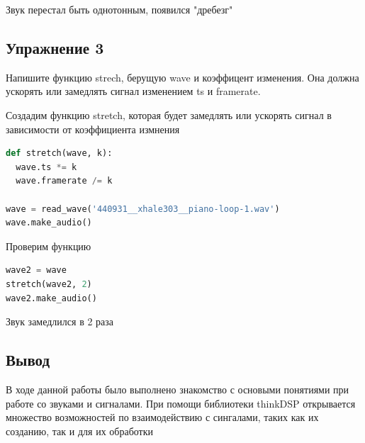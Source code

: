 Звук перестал быть однотонным, появился "дребезг"


\subsection{Упражнение 3}

Напишите функцию strech, берущую wave и коэффицент изменения. Она должна ускорять или замедлять сигнал изменением ts и framerate.

Создадим функцию stretch, которая будет замедлять или ускорять сигнал в зависимости от коэффициента измнения
\begin{lstlisting}[language=Python]
def stretch(wave, k):
  wave.ts *= k
  wave.framerate /= k
  
wave = read_wave('440931__xhale303__piano-loop-1.wav')
wave.make_audio()
\end{lstlisting}

Проверим функцию
\begin{lstlisting}[language=Python]
wave2 = wave
stretch(wave2, 2)
wave2.make_audio()
\end{lstlisting}

Звук замедлился в 2 раза

\subsection{Вывод}
В ходе данной работы было выполнено знакомство с основыми понятиями при работе со звуками и сигналами. При помощи библиотеки thinkDSP открывается множество возможностей по взаимодействию с сингалами, таких как их созданию, так и для их обработки
